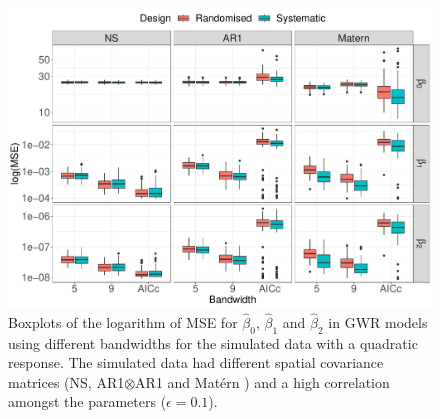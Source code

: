 \documentclass[a4paper]{article} 	%
\newcommand{\Matern}{Mat\'ern }
\begin{document}
\begin{figure}[H]
	\centering
	\includegraphics[width=\linewidth]{Expt/Col_QuaCombMSE_newpar_eta01.pdf}
	\caption{Boxplots of the logarithm of MSE for $\hat{\beta}_0$, $\hat{\beta}_1$ and $\hat{\beta}_2$ in GWR models using different bandwidths for the simulated data with a quadratic response. The simulated data had different spatial covariance matrices (NS, AR1$\otimes$AR1 and \Matern) and a high correlation amongst the parameters ($\epsilon=0.1$).} \label{fig:QuadBetaMSEeta01}
\end{figure}





\renewcommand\bibname{References}%
\printbibliography
\end{document}
